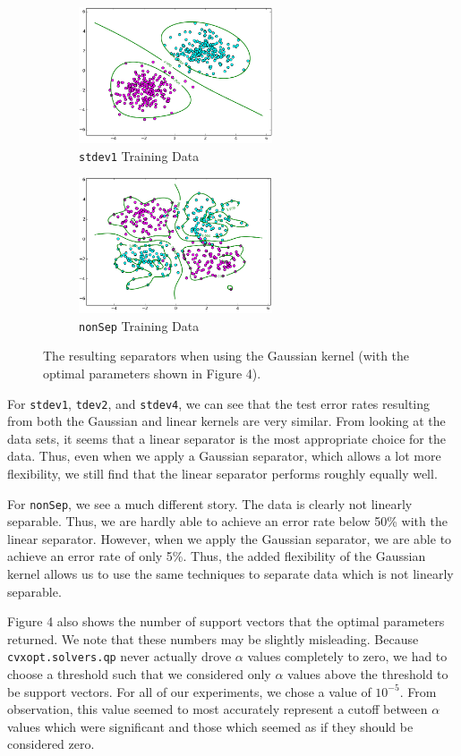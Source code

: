 \documentclass{sigchi}
\begin{document}
\begin{figure}
\centering

\begin{subfigure}[b]{2.25in}
	\includegraphics[width = 2.25in]{plots/1-3/stdev1opttrain.png}
	\caption{\texttt{stdev1} Training Data}
\end{subfigure}

\begin{subfigure}[b]{2.25in}
	\includegraphics[width = 2.25in]{plots/1-3/caseychart.png}
	\caption{\texttt{nonSep} Training Data}
\end{subfigure}
\caption{The resulting separators when using the Gaussian kernel (with the optimal parameters shown in Figure 4).}
\end{figure}

For \texttt{stdev1}, \texttt{tdev2}, and \texttt{stdev4}, we can see that the test error rates resulting from both the Gaussian and linear kernels are very similar. From looking at the data sets, it seems that a linear separator is the most appropriate choice for the data. Thus, even when we apply a Gaussian separator, which allows a lot more flexibility, we still find that the linear separator performs roughly equally well.

For \texttt{nonSep}, we see a much different story. The data is clearly not linearly separable. Thus, we are hardly able to achieve an error rate below 50\% with the linear separator. However, when we apply the Gaussian separator, we are able to achieve an error rate of only 5\%. Thus, the added flexibility of the Gaussian kernel allows us to use the same techniques to separate data which is not linearly separable.

Figure 4 also shows the number of support vectors that the optimal parameters returned. We note that these numbers may be slightly misleading. Because \texttt{cvxopt.solvers.qp} never actually drove $\alpha$ values completely to zero, we had to choose a threshold such that we considered only $\alpha$ values above the threshold to be support vectors. For all of our experiments, we chose a value of $10^{-5}$. From observation, this value seemed to most accurately represent a cutoff between $\alpha$ values which were significant and those which seemed as if they should be considered zero.
\end{document}
